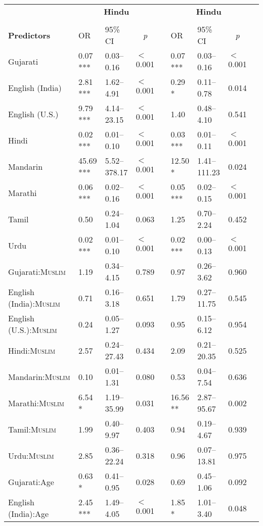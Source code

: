 \begin{table}[ht]
\begin{threeparttable}
\begin{tabular}{lllllllll}
& \multicolumn{3}{c}{\textbf{Hindu}\tnote{a}} & & \multicolumn{3}{c}{\textbf{Hindu}\tnote{a}}\\
\cline{2-4} \cline{6-8} \\[-.75em]
\textbf{Predictors} & OR & 95\% CI & \multicolumn{1}{c}{\textit{p}} & & OR & 95\% CI & \multicolumn{1}{c}{\textit{p}} \\ 
\midrule
Gujarati & 0.07 *** & 0.03--0.16 & $<$0.001 &  & 0.07 *** & 0.03--0.16 & $<$0.001 \\ 
English (India) & 2.81 *** & 1.62--4.91 & $<$0.001 &  & 0.29 * & 0.11--0.78 & 0.014 \\ 
English (U.S.) & 9.79 *** & 4.14--23.15 & $<$0.001 &  & 1.40 & 0.48--4.10 & 0.541 \\ 
Hindi & 0.02 *** & 0.01--0.10 & $<$0.001 &  & 0.03 *** & 0.01--0.11 & $<$0.001 \\ 
Mandarin & 45.69 *** & 5.52--378.17 & $<$0.001 &  & 12.50 * & 1.41--111.23 & 0.024 \\ 
Marathi & 0.06 *** & 0.02--0.16 & $<$0.001 &  & 0.05 *** & 0.02--0.15 & $<$0.001 \\ 
Tamil & 0.50 & 0.24--1.04 & 0.063 &  & 1.25 & 0.70--2.24 & 0.452 \\ 
Urdu & 0.02 *** & 0.01--0.10 & $<$0.001 &  & 0.02 *** & 0.00--0.13 & $<$0.001 \\ 
Gujarati:\textsc{Muslim} & 1.19 & 0.34--4.15 & 0.789 &  & 0.97 & 0.26--3.62 & 0.960 \\ 
English (India):\textsc{Muslim} & 0.71 & 0.16--3.18 & 0.651 &  & 1.79 & 0.27--11.75 & 0.545 \\ 
English (U.S.):\textsc{Muslim} & 0.24 & 0.05--1.27 & 0.093 &  & 0.95 & 0.15--6.12 & 0.954 \\ 
Hindi:\textsc{Muslim} & 2.57 & 0.24--27.43 & 0.434 &  & 2.09 & 0.21--20.35 & 0.525 \\ 
Mandarin:\textsc{Muslim} & 0.10 & 0.01--1.31 & 0.080 &  & 0.53 & 0.04--7.54 & 0.636 \\ 
Marathi:\textsc{Muslim} & 6.54 * & 1.19--35.99 & 0.031 &  & 16.56 ** & 2.87--95.67 & 0.002 \\ 
Tamil:\textsc{Muslim} & 1.99 & 0.40--9.97 & 0.403 &  & 0.94 & 0.19--4.67 & 0.939 \\ 
Urdu:\textsc{Muslim} & 2.85 & 0.36--22.24 & 0.318 &  & 0.96 & 0.07--13.81 & 0.975 \\ 
Gujarati:Age\tnote{b} & 0.63 * & 0.41--0.95 & 0.028 &  & 0.69 & 0.45--1.06 & 0.092 \\ 
English (India):Age\tnote{b} & 2.45 *** & 1.49--4.05 & $<$0.001 &  & 1.85 * & 1.01--3.40 & 0.048 \\ 

\end{tabular}
\end{threeparttable}
\end{table}
